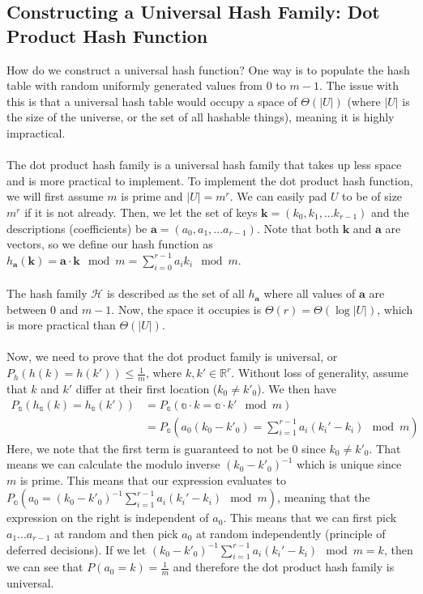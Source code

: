 \documentclass{article}
\begin{document}
\subsection*{Constructing a Universal Hash Family: Dot Product Hash Function}
How do we construct a universal hash function? One way is to populate the hash table with random uniformly generated values from $0$ to $m-1$. The issue with this is that a universal hash table would occupy a space of $\Theta(|U|)$ (where $|U|$ is the size of the universe, or the set of all hashable things), meaning it is highly impractical.\\
\\
The dot product hash family is a universal hash family that takes up less space and is more practical to implement. To implement the dot product hash function, we will first assume $m$ is prime and $|U| = m^r$. We can easily pad $U$ to be of size $m^r$ if it is not already. Then, we let the set of keys $\mathbf{k} = (k_0, k_1, ... k_{r-1})$ and the descriptions (coefficients) be $\mathbf{a} = (a_0, a_1, ... a_{r-1})$. Note that both $\mathbf{k}$ and $\mathbf{a}$ are vectors, so we define our hash function as $h_{\mathbf{a}} (\mathbf{k}) = \mathbf{a} \cdot \mathbf{k} \mod m = \sum_{i=0}^{r-1} a_i k_i \mod m$.\\
\\
The hash family $\mathcal{H}$ is described as the set of all $h_{\mathbf{a}}$ where all values of $\mathbf{a}$ are between 0 and $m-1$. Now, the space it occupies is $\Theta(r) = \Theta(\log |U|)$, which is more practical than $\Theta(|U|)$.\\
\\
Now, we need to prove that the dot product family is universal, or $P_h(h(k) = h(k')) \leq \frac{1}{m}$, where $k, k' \in \mathbb{R}^r$. Without loss of generality, assume that $k$ and $k'$ differ at their first location ($k_0 \neq k'_0$). We then have
\begin{align*}
    P_\mathbb{a}(h_\mathbb{a}(k) = h_\mathbb{a} (k')) &= P_\mathbb{a} (\mathbb{a} \cdot k = \mathbb{a} \cdot k' \mod m)\\
    &= P_\mathbb{a} (a_0 (k_0 - k'_0) = \sum_{i=1}^{r-1} a_i (k_i' - k_i) \mod m)
\end{align*}
Here, we note that the first term is guaranteed to not be 0 since $k_0 \neq k'_0$. That means we can calculate the modulo inverse $(k_0 - k'_0)^{-1}$ which is unique since $m$ is prime. This means that our expression evaluates to $P_\mathbb{a} (a_0 = (k_0 - k'_0)^{-1} \sum_{i=1}^{r-1} a_i (k_i' - k_i) \mod m)$, meaning that the expression on the right is independent of $a_0$. This means that we can first pick $a_1 ... a_{r-1}$ at random and then pick $a_0$ at random independently (principle of deferred decisions). If we let $(k_0 - k'_0)^{-1} \sum_{i=1}^{r-1} a_i (k_i' - k_i) \mod m = k$, then we can see that $P(a_0 = k) = \frac{1}{m}$ and therefore the dot product hash family is universal.
\end{document}
